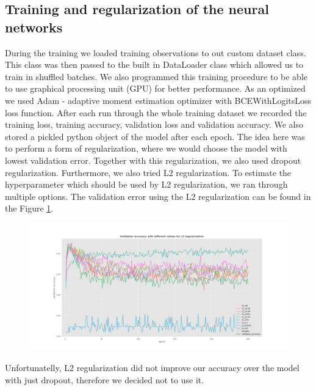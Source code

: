 \subsection{Training and regularization of the neural networks}
During the training we loaded training observations to out custom dataset class.
This class was then passed to the built in DataLoader class which allowed us to train in shuffled batches.
We also programmed this training procedure to be able to use graphical processing unit (GPU) for better performance.
As an optimized we used Adam - adaptive moment estimation \cite{kingma2014adam} optimizer with BCEWithLogitsLoss loss function. 
After each run through the whole training dataset we recorded the training loss, training accuracy, validation loss and validation accuracy.
We also stored a pickled python object of the model after each epoch.
The idea here was to perform a form of regularization, where we would choose the model with lowest validation error.
Together with this regularization, we also used dropout regularization.
Furthermore, we also tried L2 regularization. 
To estimate the hyperparameter which should be used by L2 regularization, we ran through multiple options.
The validation error using the L2 regularization can be found in the Figure \ref{fig:L2_reg}.

\begin{figure}
    \centering
    \includegraphics[width=\linewidth]{images/val_acc_l2.png}
    \caption{}
    \label{fig:L2_reg}
\end{figure}

Unfortunatelly, L2 regularization did not improve our accuracy over the model with just dropout, therefore we decided not to use it.
